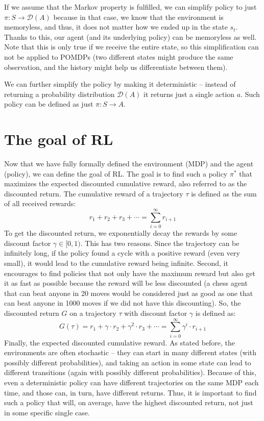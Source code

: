 \documentclass[
  digital,     %
  oneside,     %
  nosansbold,  %
  nocolorbold, %
  lof,         %
  lot,         %
]{fithesis4}
\begin{document}
If we assume that the Markov property is fulfilled, we can simplify policy to just $\pi\colon S \to \mathcal{D}(A)$ because in that case, we know that the environment is memoryless, and thus, it does not matter how we ended up in the state $s_t$. Thanks to this, our agent (and its underlying policy) can be memoryless as well. Note that this is only true if we receive the entire state, so this simplification can not be applied to POMDPs (two different states might produce the same observation, and the history might help us differentiate between them).

We can further simplify the policy by making it deterministic -- instead of returning a probability distribution $\mathcal{D}(A)$ it returns just a single action $a$. Such policy can be defined as just $\pi\colon S \to A$.

\section{The goal of RL}
\label{section:goal}
Now that we have fully formally defined the environment (MDP) and the agent (policy), we can define the goal of RL. The goal is to find such a policy $\pi^*$ that maximizes the expected discounted cumulative reward, also referred to as the discounted return. The cumulative reward of a trajectory $\tau$ is defined as the sum of all received rewards:
\[
r_1+r_2+r_3+\dotsb = \sum_{i=0}^{\infty} r_{i+1}
\]
To get the discounted return, we exponentially decay the rewards by some discount factor $\gamma \in [0,1)$. This has two reasons. Since the trajectory can be infinitely long, if the policy found a cycle with a positive reward (even very small), it would lead to the cumulative reward being infinite. Second, it encourages to find policies that not only have the maximum reward but also get it as fast as possible because the reward will be less discounted (a chess agent that can beat anyone in 20 moves would be considered just as good as one that can beat anyone in 1000 moves if we did not have this discounting). So, the discounted return $G$ on a trajectory $\tau$ with discount factor $\gamma$ is defined as:
\[
G(\tau)=r_1+\gamma \cdot r_2+ \gamma^2 \cdot r_3+\dotsb = \sum_{i=0}^{\infty} \gamma^i\cdot r_{i+1}
\]
Finally, the expected discounted cumulative reward. As stated before, the environments are often stochastic -- they can start in many different states (with possibly different probabilities), and taking an action in some state can lead to different transitions (again with possibly different probabilities). Because of this, even a deterministic policy can have different trajectories on the same MDP each time, and those can, in turn, have different returns. Thus, it is important to find such a policy that will, on average, have the highest discounted return, not just in some specific single case.
\end{document}
